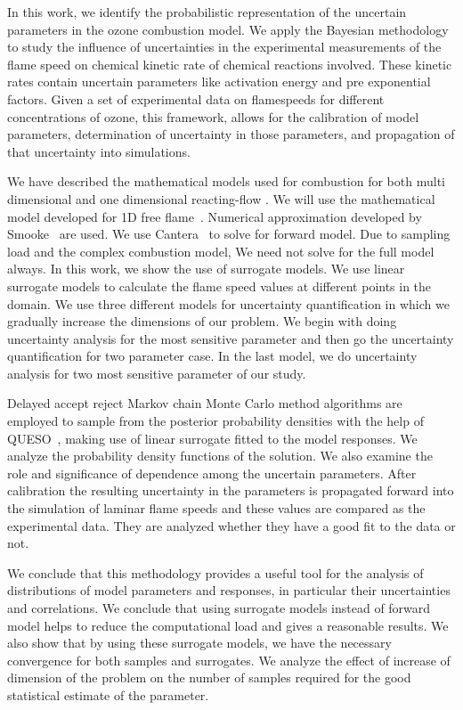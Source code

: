 

In this work, we identify the probabilistic representation of the uncertain parameters in the ozone combustion model. We  apply the Bayesian methodology to study the influence of
uncertainties in the experimental measurements of the flame speed on chemical kinetic rate of chemical reactions involved. These kinetic rates contain uncertain parameters like activation energy and pre exponential factors. Given a set of experimental data on flamespeeds for different concentrations of ozone, this framework, allows for the
calibration of model parameters, determination of uncertainty in those parameters, and propagation
of that uncertainty into simulations.



We have described the mathematical models used for combustion for both multi dimensional and one dimensional reacting-flow . We will use the mathematical model developed for 1D free flame~\cite{Kuo}. Numerical approximation developed by Smooke~\cite{Smooke} are used. We use Cantera~\cite{Cantera} to solve for forward model. Due to sampling load and the complex combustion model, We need not solve for the full model always. In this work, we show the use of surrogate models. We use linear surrogate models to calculate the flame speed values at different points in the domain. We use three different models for uncertainty quantification in which we gradually increase the dimensions of our problem. We begin with doing uncertainty analysis for the most sensitive parameter and then go the uncertainty quantification for two parameter case. In the last model, we do uncertainty analysis for two most sensitive parameter of our study.  

Delayed accept reject Markov chain Monte Carlo method 
algorithms are employed to sample from the posterior probability densities with the help of QUESO~\cite{QUESO}, making use of
linear surrogate fitted to the model responses. We analyze the  probability density functions of the solution. We
also examine the role and significance of dependence among the uncertain parameters. After calibration the resulting uncertainty in the parameters is propagated forward into
the simulation of laminar flame speeds and these values are compared as the experimental data. They are analyzed whether they have a good fit to the data or not. 


We conclude that this methodology provides a useful tool for the analysis of distributions of model parameters and
responses, in particular their uncertainties and correlations. We conclude that using surrogate models instead of forward model helps to reduce the computational load and gives a reasonable results. We also show that by using these surrogate models, we have the necessary convergence for both samples and surrogates. We analyze the effect of increase of dimension of the problem on the number of samples required for the good statistical estimate of the parameter. 
